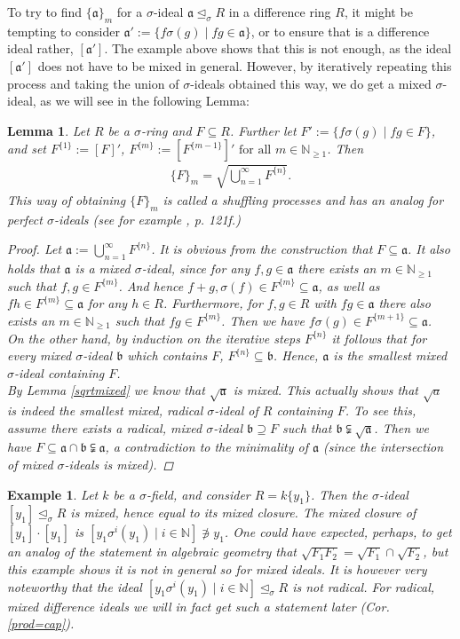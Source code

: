 \documentclass{article}
\def\NE{\mathbb{N}_{\geq1}}
\def\N{\mathbb{N}}
\def\a{\mathfrak{a}}
\def\b{\mathfrak{b}}
\def\s{\sigma}
\def\si{\unlhd_{\sigma}}
\def\fa{\text{ for all }}
\theoremstyle{plain}
\newtheorem{ex}[Satz]{Example}
\newtheorem{lem}[Satz]{Lemma}
\theoremstyle{definition}
\begin{document}
To try to find $\{\a\}_m$ for a $\s$-ideal $\a \si R$ in a difference ring $R$, it might be tempting to consider $\a':= \{ f\s(g) \mid fg \in \a \}$, or to ensure that is a difference ideal rather, $[\a']$. The example above shows that this is not enough,
as the ideal $[\a']$ does not have to be mixed in general. However, by iteratively repeating this process and taking the union of $\s$-ideals obtained this way, we do get a mixed $\s$-ideal, as we will see in the following Lemma:
\begin{lem}\label{lemshuffling}
Let $R$ be a $\s$-ring and $F \subseteq R$. Further let $F' := \{f\s(g) \mid fg \in F \}$, and set $F^{\{1\}}:= [F]'$, $F^{\{m\}}:= [F^{\{m-1\}}]' \fa m \in \NE$. Then
\begin{align} \{F\}_m = \sqrt{\bigcup_{n=1}^{\infty} F^{\{n\}}}. \end{align}
This way of obtaining $\{F\}_m$ is called a shuffling processes and has an analog for perfect $\s$-ideals (see for example \cite{levin}, p. 121f.) 
\begin{proof}
Let $\a:= \bigcup_{n=1}^{\infty} F^{\{n\}}$. It is obvious from the construction that $F \subseteq \a$. It also holds that $\a$ is a mixed $\s$-ideal, since for any $f,g \in \a$ there exists an $m \in \NE$ such that $f,g \in F^{\{m\}}$.
And hence $f + g, \s(f) \in F^{\{m\}} \subseteq \a$, as well as $fh \in F^{\{m\}} \subseteq \a$ for any $h \in R$. Furthermore, for $f, g \in R$ with $fg \in \a$ there also exists an $m \in \NE$ such that $fg \in F^{\{m\}}$. 
Then we have $f\s(g) \in F^{\{m+1\}} \subseteq \a$. \\
\indent On the other hand, by induction on the iterative steps $F^{\{n\}}$ it follows that for every mixed $\s$-ideal $\b$ which contains $F$, $F^{\{n\}} \subseteq \b$. Hence, $\a$ is the smallest mixed $\s$-ideal containing $F$. \\
\indent By Lemma \ref{sqrtmixed} we know that $\sqrt{\a}$ is mixed. This actually shows that $\sqrt a$ is indeed the smallest mixed, radical $\s$-ideal of $R$ containing $F$. To see this, assume there exists a radical, mixed $\s$-ideal $\b \supseteq F$
such that $\b \subsetneqq \sqrt{\a}$. Then we have $F \subseteq \a \cap \b \subsetneqq \a$, a contradiction to the minimality of $\a$ (since the intersection of mixed $\s$-ideals is mixed). 
\end{proof}
\end{lem}


\begin{ex} %
Let $k$ be a $\s$-field, and consider $R = k\{y_1\}$. Then the $\s$-ideal $[y_1] \si R$ is mixed, hence equal to its mixed closure.
The mixed closure of $[y_1] \cdot [y_1]$ is $[ y_1 \s^i(y_1) \mid i \in \N ] \not \ni y_1$.
One could have expected, perhaps, to get an analog of the statement in algebraic geometry that $\sqrt{F_1  F_2 } = \sqrt{F_1} \cap \sqrt{F_2}$, but this example shows it is not in general so for mixed ideals.
It is however very noteworthy that the ideal $[ y_1 \s^i(y_1) \mid i \in \N ] \si R$ is not radical. For radical, mixed difference ideals we will in fact get such a statement later (Cor. \ref{prod=cap}).
\end{ex}
\end{document}
